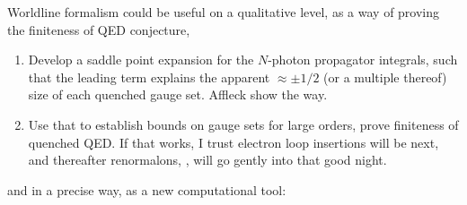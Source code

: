 Worldline formalism could be useful on a qualitative level, as a way of
proving the finiteness of QED conjecture,
    \begin{enumerate}
  \item
Develop a saddle point expansion for the $N$-photon propagator
integrals, such that the
leading term explains the apparent $\approx \pm 1/2$ (or a multiple
thereof) size of each quenched gauge set. Affleck \etal{}
show the way.
  \item
Use that to establish bounds on gauge sets for large orders, prove
finiteness of quenched QED. If that works, I trust electron loop
insertions will be next, and thereafter renormalons, \etc,
will go 
{gently into that good night}.
    \end{enumerate}
and in a precise way, as a new computational tool:
